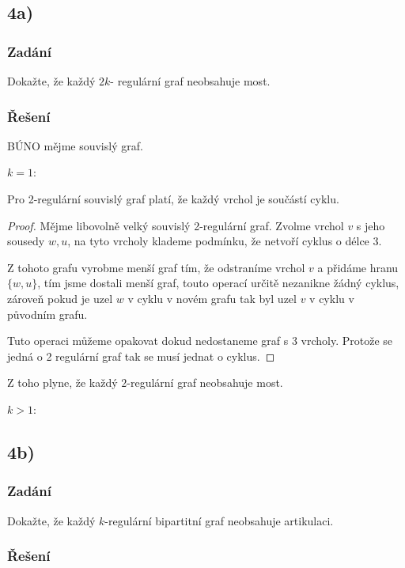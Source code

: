 \documentclass[../main.tex]{subfiles}
\begin{document}
\subsection{4a)}
\subsubsection*{Zadání}
Dokažte, že každý $2k$- regulární graf neobsahuje most.
\subsubsection*{Řešení}

BÚNO mějme souvislý graf. 

$k = 1$:
\begin{lemma*}
    Pro 2-regulární souvislý graf platí, že každý vrchol je součástí cyklu. 
\end{lemma*}
\begin{proof}
    Mějme libovolně velký souvislý 2-regulární graf. 
    Zvolme vrchol $v$ s jeho sousedy $w,u$, 
    na tyto vrcholy klademe podmínku, že netvoří cyklus o délce 3. 
    
    Z tohoto grafu vyrobme menší graf tím, že odstraníme vrchol $v$ a přidáme hranu $\{w,u\}$, tím jsme dostali menší graf, touto operací určitě nezanikne žádný cyklus, zároveň pokud je uzel $w$ v cyklu v novém grafu tak byl uzel $v$  v cyklu v původním grafu. 
    
    Tuto operaci můžeme opakovat dokud nedostaneme graf s 3 vrcholy. Protože se jedná o 2 regulární graf tak se musí jednat o cyklus. 
\end{proof}

Z toho plyne, že každý $2$-regulární graf neobsahuje  most. 

$k>1$:






\subsection{4b)}
\subsubsection*{Zadání}
Dokažte, že každý $k$-regulární bipartitní graf neobsahuje artikulaci.

\subsubsection*{Řešení}
\end{document}

